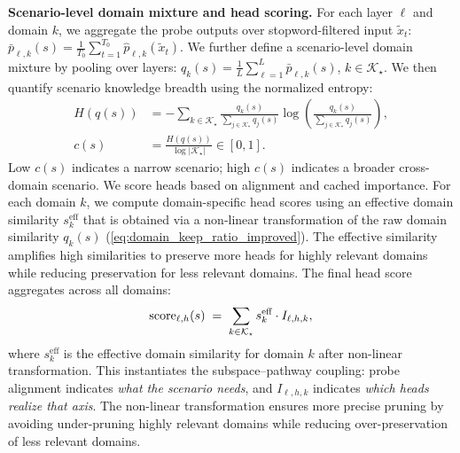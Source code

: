 \textbf{Scenario-level domain mixture and head scoring.}
For each layer $\ell$ and domain $k$, we aggregate the probe outputs over stopword-filtered input $\tilde{x}_t$: \(\bar p_{\ell,k}(s) = \frac{1}{T_0}\sum_{t=1}^{T_0} \hat p_{\ell,k}(\tilde{x}_t)\).
We further define a scenario-level domain mixture by pooling over layers: \(q_k(s) = \frac{1}{L}\sum_{\ell=1}^{L}\bar p_{\ell,k}(s)\), \(k\in\mathcal{K}_\star\).
We then quantify scenario knowledge breadth using the normalized entropy:
{\small
\begin{equation}
\label{eq:on:breadth}
\begin{aligned}
H(q(s))
&= -\sum_{k\in\mathcal{K}_\star}
\frac{q_k(s)}{\sum_{j\in\mathcal{K}_\star} q_j(s)}
\log\!\left(\frac{q_k(s)}{\sum_{j\in\mathcal{K}_\star} q_j(s)}\right),\\
c(s)
&= \frac{H\left(q\left(s\right)\right)}{\log |\mathcal{K}_\star|}\in[0,1].
\end{aligned}
\end{equation}
}
Low $c(s)$ indicates a narrow scenario; high $c(s)$ indicates a broader cross-domain scenario.
We score heads based on alignment and cached importance.
For each domain $k$, we compute domain-specific head scores using an effective domain similarity $s_k^{\text{eff}}$ that is obtained via a non-linear transformation of the raw domain similarity $q_k(s)$ (\cref{eq:domain_keep_ratio_improved}).
The effective similarity amplifies high similarities to preserve more heads for highly relevant domains while reducing preservation for less relevant domains.
The final head score aggregates across all domains:
{\small
\begin{equation}
\vspace{-5pt}
\label{eq:on:score}
\mathrm{score}_{\ell,h}(s)
\;=\;
\sum_{k\in\mathcal{K}_\star} s_k^{\text{eff}} \cdot I_{\ell,h,k},
\vspace{-5pt}
\end{equation}
}
where $s_k^{\text{eff}}$ is the effective domain similarity for domain $k$ after non-linear transformation.
This instantiates the subspace--pathway coupling: probe alignment indicates \emph{what the scenario needs}, and $I_{\ell,h,k}$ indicates \emph{which heads realize that axis}.
The non-linear transformation ensures more precise pruning by avoiding under-pruning highly relevant domains while reducing over-preservation of less relevant domains.


